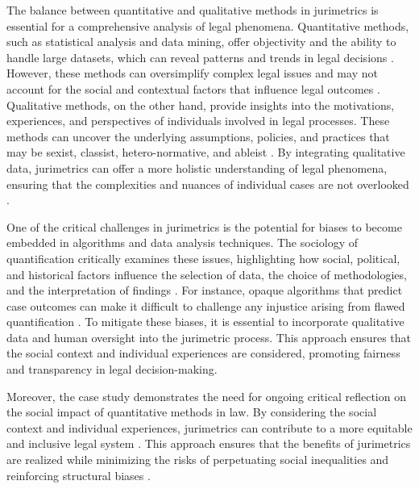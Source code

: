 The balance between quantitative and qualitative methods in jurimetrics is essential for a comprehensive analysis of legal phenomena. Quantitative methods, such as statistical analysis and data mining, offer objectivity and the ability to handle large datasets, which can reveal patterns and trends in legal decisions \cite{10.1177/0094306118767649,de2010jurimetrics}. However, these methods can oversimplify complex legal issues and may not account for the social and contextual factors that influence legal outcomes \cite{10.1590/data.2022.65.3.267,10.1057/s41599-020-0396-5}. Qualitative methods, on the other hand, provide insights into the motivations, experiences, and perspectives of individuals involved in legal processes. These methods can uncover the underlying assumptions, policies, and practices that may be sexist, classist, hetero-normative, and ableist \cite{10.1590/data.2022.65.3.267,10.1057/s41599-020-0396-5}. By integrating qualitative data, jurimetrics can offer a more holistic understanding of legal phenomena, ensuring that the complexities and nuances of individual cases are not overlooked \cite{10.1590/data.2022.65.3.267,10.1057/s41599-020-0396-5}.

One of the critical challenges in jurimetrics is the potential for biases to become embedded in algorithms and data analysis techniques. The sociology of quantification critically examines these issues, highlighting how social, political, and historical factors influence the selection of data, the choice of methodologies, and the interpretation of findings \cite{10.1590/data.2022.65.3.267,10.1057/s41599-020-0396-5}. For instance, opaque algorithms that predict case outcomes can make it difficult to challenge any injustice arising from flawed quantification \cite{10.1590/data.2022.65.3.267,10.1057/s41599-020-0396-5}. To mitigate these biases, it is essential to incorporate qualitative data and human oversight into the jurimetric process. This approach ensures that the social context and individual experiences are considered, promoting fairness and transparency in legal decision-making.

Moreover, the case study demonstrates the need for ongoing critical reflection on the social impact of quantitative methods in law. By considering the social context and individual experiences, jurimetrics can contribute to a more equitable and inclusive legal system \cite{10.1590/data.2022.65.3.267,10.1057/s41599-020-0396-5}. This approach ensures that the benefits of jurimetrics are realized while minimizing the risks of perpetuating social inequalities and reinforcing structural biases \cite{10.1590/data.2022.65.3.267,10.1057/s41599-020-0396-5}.

